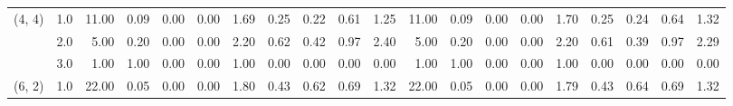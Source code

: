 \begin{tabular}{llrrrrrrrrrrrrrrrrrr}
(4, 4) & 1.0 &              11.00 &                     0.09 &                                 0.00 &                             0.00 &                           1.69 &                                               0.25 &                                            0.22 &                                            0.61 &                                        1.25 &              11.00 &                     0.09 &                                 0.00 &                             0.00 &                           1.70 &                                               0.25 &                                            0.24 &                                            0.64 &                                        1.32 \\
       & 2.0 &               5.00 &                     0.20 &                                 0.00 &                             0.00 &                           2.20 &                                               0.62 &                                            0.42 &                                            0.97 &                                        2.40 &               5.00 &                     0.20 &                                 0.00 &                             0.00 &                           2.20 &                                               0.61 &                                            0.39 &                                            0.97 &                                        2.29 \\
       & 3.0 &               1.00 &                     1.00 &                                 0.00 &                             0.00 &                           1.00 &                                               0.00 &                                            0.00 &                                            0.00 &                                        0.00 &               1.00 &                     1.00 &                                 0.00 &                             0.00 &                           1.00 &                                               0.00 &                                            0.00 &                                            0.00 &                                        0.00 \\
(6, 2) & 1.0 &              22.00 &                     0.05 &                                 0.00 &                             0.00 &                           1.80 &                                               0.43 &                                            0.62 &                                            0.69 &                                        1.32 &              22.00 &                     0.05 &                                 0.00 &                             0.00 &                           1.79 &                                               0.43 &                                            0.64 &                                            0.69 &                                        1.32 \\

\end{tabular}
